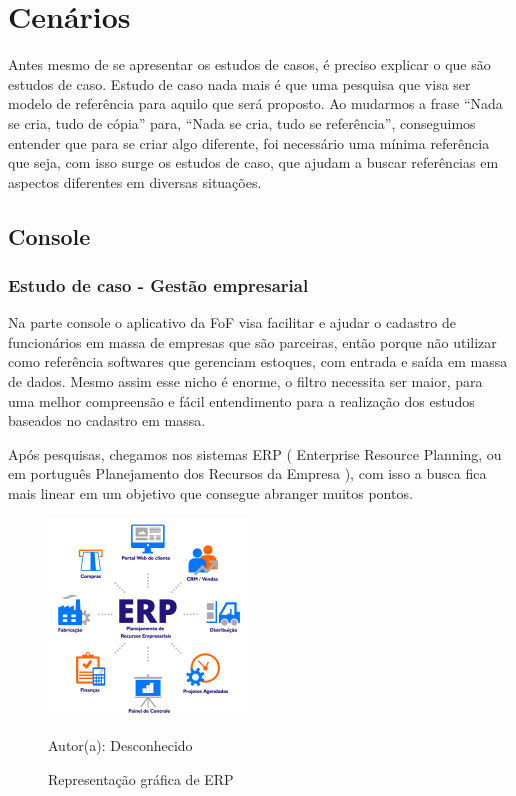 \section{Cenários}
\vspace*{1cm}
Antes mesmo de se apresentar os estudos de casos, é preciso explicar o que são estudos de caso.
Estudo de caso nada mais é que uma pesquisa que visa ser modelo de referência para aquilo que será proposto. Ao mudarmos a frase “Nada se cria, tudo de cópia” para, “Nada se cria, tudo se referência”, conseguimos entender que para se criar algo diferente, foi necessário uma mínima referência que seja, com isso surge os estudos de caso, que ajudam a buscar referências em aspectos diferentes em diversas situações.

\subsection{Console}


\subsubsection{Estudo de caso - Gestão empresarial}

Na parte console o aplicativo da FoF visa facilitar e ajudar o cadastro de funcionários em massa de empresas que são parceiras, então porque não utilizar como referência softwares que gerenciam estoques, com entrada e saída em massa de dados. Mesmo assim esse nicho é enorme, o filtro necessita ser maior, para uma melhor compreensão e fácil entendimento para a realização dos estudos baseados no cadastro em massa.

Após pesquisas, chegamos nos sistemas ERP ( Enterprise Resource Planning, ou em português Planejamento dos Recursos da Empresa ), com isso a busca fica mais linear em um objetivo que consegue abranger muitos pontos.

\begin{figure}[!h]
	\centering
	\caption{Representação gráfica de ERP}
	\includegraphics[width=200px, height=200px]{./images/erp.png}
	\par{Autor(a): Desconhecido}
\end{figure}


